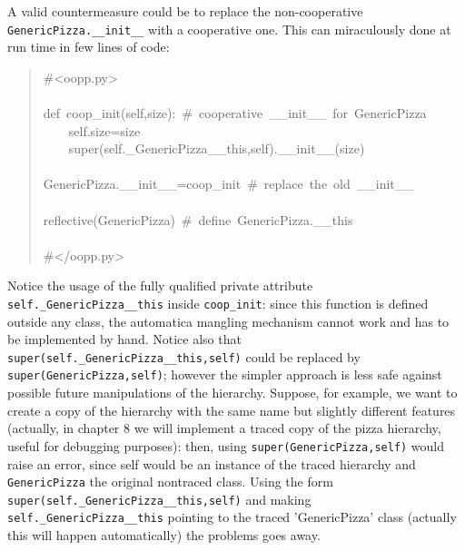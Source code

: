 \documentclass[10pt,english]{article}
\begin{document}
A valid countermeasure could be to replace the non-cooperative
\texttt{GenericPizza.{\_}{\_}init{\_}{\_}} with a cooperative one. This can miraculously
done at run time in few lines of code:
\begin{quote}
\begin{ttfamily}\begin{flushleft}
\mbox{{\#}<oopp.py>}\\
\mbox{}\\
\mbox{def~coop{\_}init(self,size):~{\#}~cooperative~{\_}{\_}init{\_}{\_}~for~GenericPizza}\\
\mbox{~~~~self.size=size}\\
\mbox{~~~~super(self.{\_}GenericPizza{\_}{\_}this,self).{\_}{\_}init{\_}{\_}(size)}\\
\mbox{}\\
\mbox{GenericPizza.{\_}{\_}init{\_}{\_}=coop{\_}init~{\#}~replace~the~old~{\_}{\_}init{\_}{\_}}\\
\mbox{}\\
\mbox{reflective(GenericPizza)~{\#}~define~GenericPizza.{\_}{\_}this}\\
\mbox{}\\
\mbox{{\#}</oopp.py>}
\end{flushleft}\end{ttfamily}
\end{quote}

Notice the usage of the fully qualified private attribute
\texttt{self.{\_}GenericPizza{\_}{\_}this} inside \texttt{coop{\_}init}: since this function 
is defined outside any class, the automatica mangling mechanism cannot 
work and has to be implemented by hand. Notice also that 
\texttt{super(self.{\_}GenericPizza{\_}{\_}this,self)} could be replaced by
\texttt{super(GenericPizza,self)}; however the simpler approach is
less safe against possible future manipulations of the hierarchy. 
Suppose, for example, we want to create a copy of the hierarchy
with the same name but slightly different features (actually,
in chapter 8 we will implement a traced copy of the pizza hierarchy, 
useful for debugging purposes): then, using \texttt{super(GenericPizza,self)}
would raise an error, since self would be an instance of the traced
hierarchy and \texttt{GenericPizza}  the original nontraced class. Using
the form \texttt{super(self.{\_}GenericPizza{\_}{\_}this,self)} and making 
\texttt{self.{\_}GenericPizza{\_}{\_}this} pointing to the traced 'GenericPizza'
class (actually this will happen automatically) the problems goes
away.
\end{document}
